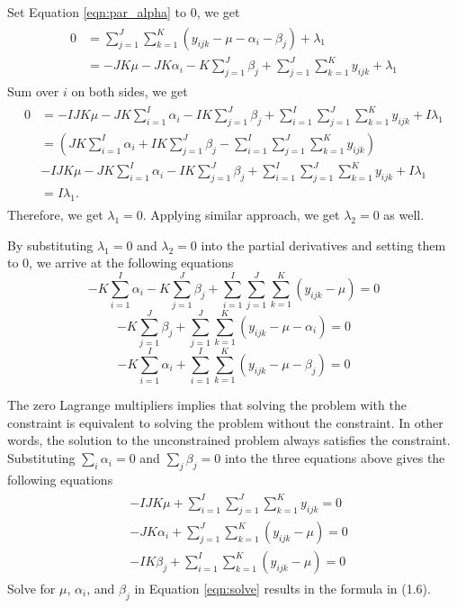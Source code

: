 \documentclass{scrartcl}
\begin{document}
Set Equation \eqref{eqn:par_alpha} to 0, we get
\begin{align}
\begin{split}
0 & = \sum_{j=1}^J \sum_{k=1}^K (y_{ijk}-\mu-\alpha_i-\beta_j)+\lambda_1 \\
  & = -JK \mu -JK \alpha_i - K \sum_{j=1}^J \beta_j
      + \sum_{j=1}^J \sum_{k=1}^K y_{ijk} + \lambda_1 
\end{split}
\end{align}
Sum over $i$ on both sides, we get
\begin{align}
\begin{split}
0 & = -IJK \mu -JK \sum_{i=1}^I \alpha_i - IK \sum_{j=1}^J \beta_j
      + \sum_{i=1}^I \sum_{j=1}^J \sum_{k=1}^K y_{ijk} + I\lambda_1 \\
  & = \left( JK \sum_{i=1}^I \alpha_i + IK \sum_{j=1}^J \beta_j
     -\sum_{i=1}^I \sum_{j=1}^J \sum_{k=1}^K y_{ijk} \right) \\
  & -IJK \mu -JK \sum_{i=1}^I \alpha_i - IK \sum_{j=1}^J \beta_j
      + \sum_{i=1}^I \sum_{j=1}^J \sum_{k=1}^K y_{ijk} + I\lambda_1 \\
  & = I\lambda_1 .
\end{split}
\end{align}
Therefore, we get $\lambda_1 = 0$. Applying similar approach,
we get $\lambda_2 = 0$ as well.

By substituting $\lambda_1=0$ and $\lambda_2=0$ into the partial derivatives
and setting them to 0, we arrive at the following equations
\begin{equation}
-K \sum_{i=1}^I \alpha_i - K \sum_{j=1}^J \beta_j
+ \sum_{i=1}^I \sum_{j=1}^J \sum_{k=1}^K (y_{ijk}-\mu) = 0
\label{eqn:one}
\end{equation}
\begin{equation}
- K \sum_{j=1}^J \beta_j
+ \sum_{j=1}^J \sum_{k=1}^K (y_{ijk}-\mu-\alpha_i) = 0
\label{eqn:two}
\end{equation} 
\begin{equation}
- K \sum_{i=1}^I \alpha_i
+ \sum_{i=1}^I \sum_{k=1}^K (y_{ijk}-\mu-\beta_j) = 0
\label{eqn:three}
\end{equation}

The zero Lagrange multipliers implies that solving the problem with the constraint
is equivalent to solving the problem without the constraint. In other words,
the solution to the unconstrained problem always satisfies the constraint.
Substituting $\sum_i \alpha_i = 0$ and $\sum_j \beta_j = 0$ into the three equations
above gives the following equations
\begin{align}
\begin{split}
& -IJK \mu + \sum_{i=1}^I \sum_{j=1}^J \sum_{k=1}^K y_{ijk} = 0 \\
& -JK \alpha_i + \sum_{j=1}^J \sum_{k=1}^K (y_{ijk}-\mu) = 0 \\
& -IK \beta_j + \sum_{i=1}^I \sum_{k=1}^K (y_{ijk}-\mu) = 0
\end{split}
\label{eqn:solve}
\end{align}
Solve for $\mu$, $\alpha_i$, and $\beta_j$ in Equation \eqref{eqn:solve}
results in the formula in (1.6).
\end{document}
